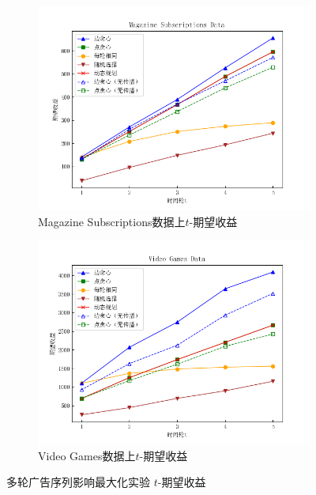 \begin{figure}[th]
    \begin{subfigure}{0.45\textwidth}
       \includegraphics[width=\linewidth]{figure/sasim/nonadp/non_cn_magazine}
        \caption{Magazine Subscriptions数据上$t$-期望收益}
        \label{fig:non3}
    \end{subfigure}
    \hfill
    \begin{subfigure}{0.45\textwidth}
        \includegraphics[width=\linewidth]{figure/sasim/nonadp/non_cn_video}
        \caption{Video Games数据上$t$-期望收益}
        \label{fig:non4}
    \end{subfigure}
    \caption{多轮广告序列影响最大化实验 $t$-期望收益}
    \label{fig:non}
\end{figure}

